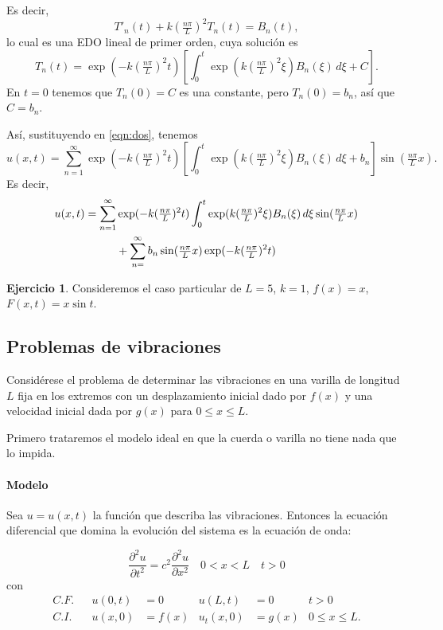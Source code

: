 \documentclass[11pt,letterpaper,draft]{report}
\theoremstyle{plain}
\theoremstyle{definition}
\newtheorem{exercise}[theorem]{Ejercicio}
\theoremstyle{remark}
\newcommand\<{\langle}
\renewcommand\>{\rangle}
\begin{document}
Es decir,
\[
  T'_n(t)
  +k(\tfrac{n\pi}{L})^2T_n(t)
  =B_n(t)
,\]
lo cual es una EDO lineal de primer orden, cuya solución es
\[
  T_n(t)
  =
  \exp(-k(\tfrac{n\pi}{L})^2t)
  \left[
  \int_{0}^{t}\exp(k(\tfrac{n\pi}{L})^2\xi)
  B_n(\xi)\,d\xi + C\right]
.\]
En $t=0$ tenemos que $T_n(0)=C$ es una constante, pero $T_n(0)=b_n$,
así que $C=b_n$.

Así, sustituyendo en \eqref{eqn:dos}, tenemos
\[
  u(x,t)
  =
  \sum_{n=1}^{\infty}\exp(-k(\tfrac{n\pi}{L})^2t)
  \left[
    \int_{0}^{t}\exp(k(\tfrac{n\pi}{L})^2\xi)B_n(\xi)\,d\xi + b_n
  \right]\sin(\tfrac{n\pi}{L}x)
.\]
Es decir,
\begin{align*}
  u(x,t)
  &=
  \sum_{n=1}^{\infty}\exp(-k(\tfrac{n\pi}{L})^2t)
  \int_{0}^{t}\exp(k(\tfrac{n\pi}{L})^2\xi)
  B_n(\xi)\,d\xi\sin(\tfrac{n\pi}{L}x) \\
  &\hspace{10mm} +
  \sum_{n=}^{\infty}b_n\sin(\tfrac{n\pi}{L}x)
  \exp(-k(\tfrac{n\pi}{L})^2t)
\end{align*}

\begin{exercise}
  Consideremos el caso particular de $L=5$, $k=1$, $f(x)=x$, $F(x,t)=x\sin t$.
\end{exercise}

\subsection{Problemas de vibraciones}

Considérese el problema de determinar las vibraciones en una varilla
de longitud $L$ fija en los extremos con un desplazamiento inicial dado
por $f(x)$ y una velocidad inicial dada por $g(x)$ para $0\leq x\leq
L$.

Primero trataremos el modelo ideal en que la cuerda o varilla no tiene
nada que lo impida.

\paragraph{Modelo}
Sea $u=u(x,t)$ la función que describa las vibraciones. Entonces la
ecuación diferencial que domina la evolución del sistema es la
ecuación de onda:

\[
    \frac{\partial^2u}{\partial t^2 }
    =c^2   \frac{\partial^2u}{\partial x^2}
    \quad 0<x<L \quad t>0
\]
con
\begin{align*}
  C.F.&& u(0,t)&=0 & u(L,t)&=0 & t>0 \\
  C.I.&& u(x,0)&=f(x) & u_t(x,0)&=g(x) & 0\leq x\leq L.
\end{align*}
\end{document}
